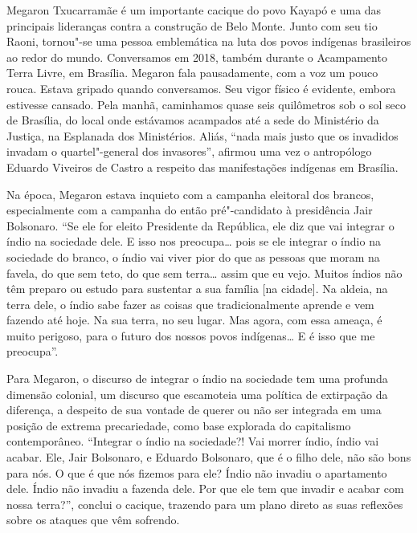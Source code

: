 Megaron Txucarramãe é um importante cacique do povo Kayapó e uma das
principais lideranças contra a construção de Belo Monte. Junto com seu
tio Raoni, tornou"-se uma pessoa emblemática na luta dos povos indígenas
brasileiros ao redor do mundo. Conversamos em 2018, também durante o
Acampamento Terra Livre, em Brasília. Megaron fala pausadamente, com a
voz um pouco rouca. Estava gripado quando conversamos. Seu vigor físico
é evidente, embora estivesse cansado. Pela manhã, caminhamos quase seis
quilômetros sob o sol seco de Brasília, do local onde estávamos
acampados até a sede do Ministério da Justiça, na Esplanada dos
Ministérios. Aliás, ``nada mais justo que os invadidos invadam o
quartel"-general dos invasores'', afirmou uma vez o antropólogo Eduardo
Viveiros de Castro a respeito das manifestações indígenas em Brasília.

Na época, Megaron estava inquieto com a campanha eleitoral dos brancos,
especialmente com a campanha do então pré"-candidato à presidência Jair
Bolsonaro. ``Se ele for eleito Presidente da República, ele diz que vai
integrar o índio na sociedade dele. E isso nos preocupa\ldots{} pois se
ele integrar o índio na sociedade do branco, o índio vai viver pior do
que as pessoas que moram na favela, do que sem teto, do que sem
terra\ldots{} assim que eu vejo. Muitos índios não têm preparo ou estudo
para sustentar a sua família {[}na cidade{]}. Na aldeia, na terra dele,
o índio sabe fazer as coisas que tradicionalmente aprende e vem fazendo
até hoje. Na sua terra, no seu lugar. Mas agora, com essa ameaça, é
muito perigoso, para o futuro dos nossos povos indígenas\ldots{} E é
isso que me preocupa''.

Para Megaron, o discurso de integrar o índio na sociedade tem uma
profunda dimensão colonial, um discurso que escamoteia uma política de
extirpação da diferença, a despeito de sua vontade de querer ou não ser
integrada em uma posição de extrema precariedade, como base explorada do
capitalismo contemporâneo. ``Integrar o índio na sociedade?! Vai morrer
índio, índio vai acabar. Ele, Jair Bolsonaro, e Eduardo Bolsonaro, que é
o filho dele, não são bons para nós. O que é que nós fizemos para ele?
Índio não invadiu o apartamento dele. Índio não invadiu a fazenda dele.
Por que ele tem que invadir e acabar com nossa terra?'', conclui o
cacique, trazendo para um plano direto as suas reflexões sobre os
ataques que vêm sofrendo.


